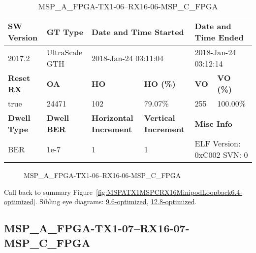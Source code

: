 \begin{table}[h]
\centering
\caption{MSP\_A\_FPGA-TX1-06--RX16-06-MSP\_C\_FPGA}
\label{tab:MSPAFPGATX106RX1606MSPCFPGA6.4-optimized}
\begin{tabular}{@{}|l|l|l|l|l|l|@{}}
\toprule
\textbf{SW Version}                & \textbf{GT Type}   & \multicolumn{2}{l|}{\textbf{Date and Time Started}}            & \multicolumn{2}{l|}{\textbf{Date and Time Ended}}        \\ \midrule
2017.2                       & UltraScale GTH          & \multicolumn{2}{l|}{2018-Jan-24 03:11:04}                   & \multicolumn{2}{l|}{2018-Jan-24 03:12:14}               \\ \midrule
\textbf{Reset RX}                  & \textbf{OA} & \textbf{HO}   & \textbf{HO (\%)} & \textbf{VO} & \textbf{VO (\%)} \\ \midrule
true & 24471        & 102          & 79.07\%        & 255        & 100.00\%       \\ \midrule
\textbf{Dwell Type}                & \textbf{Dwell BER} & \textbf{Horizontal Increment} & \textbf{Vertical Increment}    & \multicolumn{2}{l|}{\textbf{Misc Info}}                  \\ \midrule
BER                            & 1e-7        & 1        & 1           & \multicolumn{2}{l|}{ELF Version: 0xC002 SVN: 0}                         \\ \bottomrule
\end{tabular}
\end{table}

\begin{figure}[h]
\caption{MSP\_A\_FPGA-TX1-06--RX16-06-MSP\_C\_FPGA} \label{fig:MSPAFPGATX106RX1606MSPCFPGA6.4-optimized}
\end{figure}

Call back to summary Figure~\ref{fig:MSPATX1MSPCRX16MinipodLoopback6.4-optimized}.
Sibling eye diagrams: \hyperref[sec:MSPAFPGATX106RX1606MSPCFPGA9.6-optimized]{9.6-optimized}, \hyperref[sec:MSPAFPGATX106RX1606MSPCFPGA12.8-optimized]{12.8-optimized}.

\clearpage
\newpage


\subsection{MSP\_A\_FPGA-TX1-07--RX16-07-MSP\_C\_FPGA}\label{sec:MSPAFPGATX107RX1607MSPCFPGA6.4-optimized}

